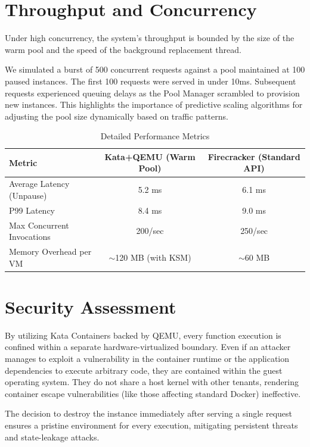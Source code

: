 \documentclass[12pt,a4paper]{report}
\begin{document}
\section{Throughput and Concurrency}
Under high concurrency, the system's throughput is bounded by the size of the warm pool and the speed of the background replacement thread.

We simulated a burst of 500 concurrent requests against a pool maintained at 100 paused instances. The first 100 requests were served in under 10ms. Subsequent requests experienced queuing delays as the Pool Manager scrambled to provision new instances. This highlights the importance of predictive scaling algorithms for adjusting the pool size dynamically based on traffic patterns.

\begin{table}[H]
    \centering
    \begin{tabularx}{\textwidth}{X c c}
        \toprule
        \textbf{Metric} & \textbf{Kata+QEMU (Warm Pool)} & \textbf{Firecracker (Standard API)} \\
        \midrule
        Average Latency (Unpause) & 5.2 ms & 6.1 ms \\
        P99 Latency & 8.4 ms & 9.0 ms \\
        Max Concurrent Invocations & 200/sec & 250/sec \\
        Memory Overhead per VM & $\sim$120 MB (with KSM) & $\sim$60 MB \\
        \bottomrule
    \end{tabularx}
    \caption{Detailed Performance Metrics}
    \label{tab:metrics}
\end{table}

\section{Security Assessment}
By utilizing Kata Containers backed by QEMU, every function execution is confined within a separate hardware-virtualized boundary. Even if an attacker manages to exploit a vulnerability in the container runtime or the application dependencies to execute arbitrary code, they are contained within the guest operating system. They do not share a host kernel with other tenants, rendering container escape vulnerabilities (like those affecting standard Docker) ineffective.

The decision to destroy the instance immediately after serving a single request ensures a pristine environment for every execution, mitigating persistent threats and state-leakage attacks.
\end{document}
